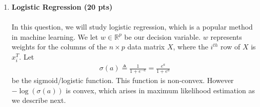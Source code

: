 \begin{enumerate}
    \item \textbf{Logistic Regression (20 pts)}\\\\
    In this question, we will study logistic regression, which is a popular method in machine learning. We let $w \in \mathbb{R}^p$ be our decision variable. $w$ represents weights for the columns of the $n \times p$ data matrix $X$, where the $i^{th}$ row of $X$ is $x_i^T$. Let
    \begin{align*}
        \sigma(a) \triangleq \frac{1}{1+e^{-a}}=\frac{e^{a}}{1+e^{a}}
    \end{align*}
    be the sigmoid/logistic function. This function is non-convex. However $-\log(\sigma(a))$ is convex, which arises in maximum likelihood estimation as we describe next.
    

\end{enumerate}
